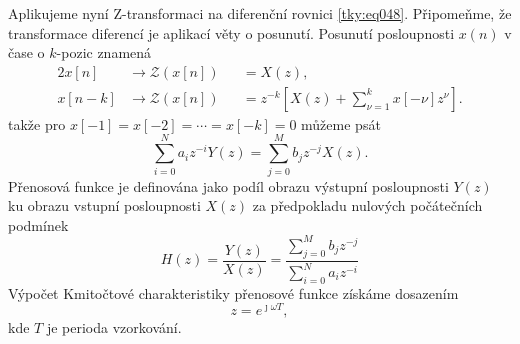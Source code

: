      Aplikujeme nyní \(\mathrm{Z}\)-transformaci na diferenční rovnici \ref{tky:eq048}. Připomeňme,
      že transformace diferencí je aplikací věty o posunutí. Posunutí posloupnosti \(x(n)\) v čase o
      \(k\)-pozic znamená
      \begin{alignat*}{2}
        x[n]   &\rightarrow \mathcal{Z}(x[n])&&= X(z),  \\
        x[n-k] &\rightarrow \mathcal{Z}(x[n])&&= z^{-k}\left[X(z)+\sum^k_{\nu=1} x[-\nu]z^\nu\right].
      \end{alignat*}
      takže pro \(x[-1] = x[-2] = \cdots = x[-k] =0\) můžeme psát
      \begin{equation}\label{tky:eq053}
        \sum_{i=0}^N a_iz^{-i}Y(z) = \sum_{j=0}^M b_jz^{-j}X(z). 
      \end{equation}
      Přenosová funkce je definována jako podíl obrazu výstupní posloupnosti \(Y(z)\) ku obrazu
      vstupní posloupnosti \(X(z)\) za předpokladu nulových počátečních podmínek
      \begin{equation}\label{tky:eq054}
        H(z) = \dfrac{Y(z)}{X(z)} = \dfrac{\sum_{j=0}^Mb_jz^{-j}}{\sum_{i=0}^Na_iz^{-i}}
      \end{equation}
      Výpočet Kmitočtové charakteristiky přenosové funkce získáme dosazením
      \begin{equation}\label{tky:eq055}
        z = e^{\jmath\omega T},
      \end{equation}
      kde \(T\) je perioda vzorkování. 

